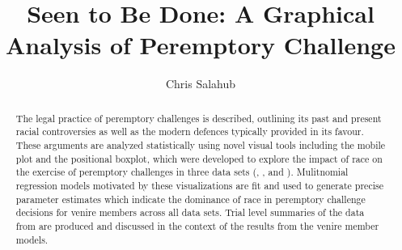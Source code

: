 \documentclass[12pt]{article}
\title{Seen to Be Done: A Graphical Analysis of Peremptory Challenge}
\author{Chris Salahub}
\begin{document}
\maketitle

\begin{abstract}
The legal practice of peremptory challenges is described, outlining its past and present racial controversies as well as the
modern defences typically provided in its favour. These arguments are analyzed statistically using novel visual tools including
the mobile plot and the positional boxplot, which were developed to explore the impact of race on the exercise of peremptory
challenges in three data sets (\cite{JurySunshineProj}, \cite{StubbornLegacy}, and \cite{PerempChalMurder}). Mulitnomial
regression models motivated by these visualizations are fit and used to generate precise parameter estimates which indicate the
dominance of race in peremptory challenge decisions for venire members across all data sets. Trial level summaries of the data
from \cite{JurySunshineProj} are produced and discussed in the context of the results from the venire member models.
\end{abstract}
 





 




\end{document}
